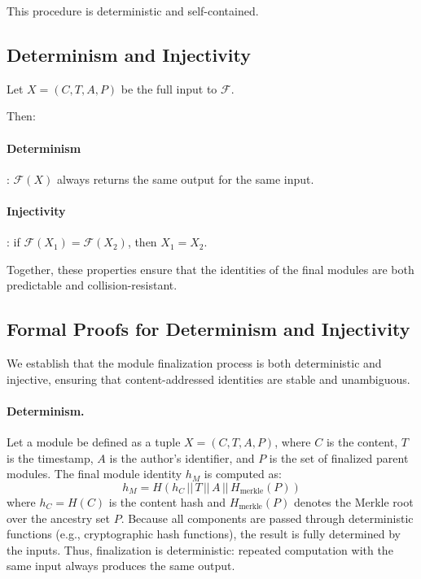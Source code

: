 \documentclass[sigplan,screen]{acmart}
\begin{document}
This procedure is deterministic and self-contained.

\subsection{Determinism and Injectivity}

Let $X = (C, T, A, P)$ be the full input to $\mathcal{F}$.

Then:
\paragraph{Determinism}: $\mathcal{F}(X)$ always returns the same output for the same input.

\paragraph{Injectivity}: if  $\mathcal{F}(X_1) = \mathcal{F}(X_2)$, then $X_1 = X_2$.

Together, these properties ensure that the identities of the final modules are both predictable and collision-resistant.

\subsection{Formal Proofs for Determinism and Injectivity}
\label{sec:formal-proofs}

We establish that the module finalization process is both deterministic and injective, ensuring that content-addressed identities are stable and unambiguous.

\paragraph{Determinism.}
Let a module be defined as a tuple \( X = (C, T, A, P) \), where \( C \) is the content, \( T \) is the timestamp, \( A \) is the author's identifier, and \( P \) is the set of finalized parent modules. The final module identity \( h_M \) is computed as:
\[
h_M = H(h_C \, || \, T \, || \, A \, || \, H_{\text{merkle}}(P))
\]
where \( h_C = H(C) \) is the content hash and \( H_{\text{merkle}}(P) \) denotes the Merkle root over the ancestry set \( P \). Because all components are passed through deterministic functions (e.g., cryptographic hash functions), the result is fully determined by the inputs. Thus, finalization is deterministic: repeated computation with the same input always produces the same output.
\end{document}
